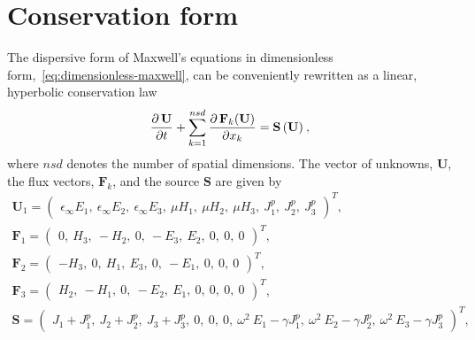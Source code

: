 \section{Conservation form}

The dispersive form of Maxwell's equations in dimensionless form,~\eqref{eq:dimensionless-maxwell}, can be conveniently rewritten as a linear, hyperbolic conservation law~\cite{Godlewski:2013tj,LeVeque:2002vc}
\begin{equation}
\frac{\partial  \, \mathbf{U}}{\partial t} + \sum_{k=1}^{nsd} \frac { \partial \, \mathbf{F}_k(\mathbf{U}) }{ \partial x_k } = \mathbf{S}\,(\mathbf{U}) \: ,
\label{maxwell-curl-equations-conservation-form}
\end{equation}
where $nsd$ denotes the number of spatial dimensions. The vector of unknowns, $\mathbf{U}$, the flux vectors, $\mathbf{F}_k$, and the source $\mathbf{S}$ are given by
\begin{equation*}
\begin{array}{c}
\mathbf{U}_1 =
  \begin{pmatrix}
    \epsilon_{\infty} E_1, \:
    \epsilon_{\infty} E_2 , \:
    \epsilon_{\infty} E_3 , \:
    \mu H_1 , \:
    \mu H_2 , \:
    \mu H_3 , \:
    J^p_1 , \:
    J^p_2 , \:
    J^p_3
\end{pmatrix}^T,
\\
\mathbf{F}_1 =
  \begin{pmatrix}
    0 ,\:
    H_3 ,\:
    -H_2 ,\:
    0 ,\:
    -E_3 ,\:
    E_2 ,\:
    0 ,\:
    0 ,\:
    0
  \end{pmatrix}^T , \\

\mathbf{F}_2 =
  \begin{pmatrix}
    - H_3 ,\:
    0 ,\:
    H_1 ,\:
    E_3 ,\:
    0 ,\:
    -E_1 ,\:
    0 ,\:
     0 ,\:
    0
  \end{pmatrix}^T , \\

\mathbf{F}_3 =
  \begin{pmatrix}
    H_2 ,\:
    -H_1 ,\:
    0 ,\:
    -E_2 ,\:
    E_1 ,\:
    0 ,\:
    0 ,\:
    0 ,\:
    0
  \end{pmatrix}^T , \\

\mathbf{S} =
  \begin{pmatrix}
    J_1 + J^p_1 ,\:
    J_2 + J^p_2 ,\:
    J_3 + J^p_3 ,\:
    0 ,\:
    0 ,\:
    0 ,\:
    \omega^2 \: E_1 - \gamma J^p_1 ,\:
    \omega^2 \: E_2 - \gamma J^p_2 ,\:
    \omega^2 \: E_3 - \gamma J^p_3
  \end{pmatrix}^T,

\end{array}
\end{equation*}

